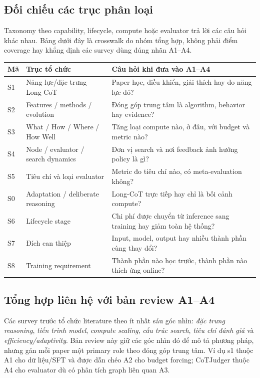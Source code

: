 \subsection{Đối chiếu các trục phân loại}
\noindent Taxonomy theo capability, lifecycle, compute hoặc evaluator trả lời các câu hỏi khác nhau. Bảng dưới đây là crosswalk do nhóm tổng hợp, không phải điểm coverage hay khẳng định các survey dùng đúng nhãn A1–A4.
\begin{samepage}
\begin{center}\small
\begin{tabularx}{\textwidth}{>{\raggedright\arraybackslash}p{1cm}>{\raggedright\arraybackslash}p{4.5cm}>{\raggedright\arraybackslash}X}
\toprule
\textbf{Mã} & \textbf{Trục tổ chức} & \textbf{Câu hỏi khi đưa vào A1–A4} \\
\midrule
S1 & Năng lực/đặc trưng Long-CoT & Paper học, điều khiển, giải thích hay đo năng lực đó? \\
S2 & Features / methods / evolution & Đóng góp trung tâm là algorithm, behavior hay evidence? \\
S3 & What / How / Where / How Well & Tăng loại compute nào, ở đâu, với budget và metric nào? \\
S4 & Node / evaluator / search dynamics & Đơn vị search và nơi feedback ảnh hưởng policy là gì? \\
S5 & Tiêu chí và loại evaluator & Metric đo tiêu chí nào, có meta-evaluation không? \\
S0 & Adaptation / deliberate reasoning & Long-CoT trực tiếp hay chỉ là bối cảnh compute? \\
S6 & Lifecycle stage & Chi phí được chuyển từ inference sang training hay giảm toàn hệ thống? \\
S7 & Đích can thiệp & Input, model, output hay nhiều thành phần cùng thay đổi? \\
S8 & Training requirement & Thành phần nào học trước, thành phần nào thích ứng online? \\
\bottomrule
\end{tabularx}
\end{center}
\end{samepage}

\subsection{Tổng hợp liên hệ với bản review A1–A4}

Các survey trước tổ chức literature theo ít nhất sáu góc nhìn: \emph{đặc trưng reasoning}, \emph{tiến trình model}, \emph{compute scaling}, \emph{cấu trúc search}, \emph{tiêu chí đánh giá} và \emph{efficiency/adaptivity}. Bản review này giữ các góc nhìn đó để mô tả phương pháp, nhưng gán mỗi paper một primary role theo đóng góp trung tâm. Ví dụ s1 thuộc A1 cho dữ liệu/SFT và được dẫn chéo A2 cho budget forcing; CoTJudger thuộc A4 cho evaluator dù có phân tích graph liên quan A3.

